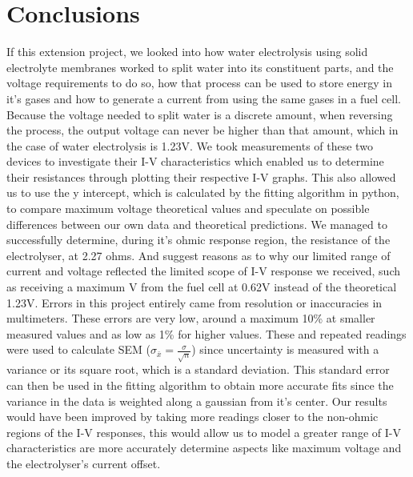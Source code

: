 \documentclass{article}
\begin{document}
    \section{Conclusions}
    If this extension project, we looked into how water electrolysis using solid electrolyte membranes worked to split water into its constituent parts, 
    and the voltage requirements to do so, how that process can be used to store energy in it's gases and how to generate a current from using the same gases in a fuel cell. 
    Because the voltage needed to split water is a discrete amount, when reversing the process, the output voltage can never be higher than that amount, which in the case of 
    water electrolysis is 1.23V.
    \newline We took measurements of these two devices to investigate their I-V characteristics which enabled us to determine their resistances through plotting their respective I-V 
    graphs. This also allowed us to use the y intercept, which is calculated by the fitting algorithm in python, to compare maximum voltage theoretical values and speculate on 
    possible differences between our own data and theoretical predictions.
    \newline We managed to successfully determine, during it's ohmic response region, the resistance of the electrolyser, at 2.27 ohms. And suggest reasons as to why our limited range of 
    current and voltage reflected the limited scope of I-V response we received, such as receiving a maximum V from the fuel cell at 0.62V instead of the theoretical 1.23V.
    \newline \newline Errors in this project entirely came from resolution or inaccuracies in multimeters. These errors are very low, around a maximum 10\% at smaller measured values and as low as 1\% for higher values. 
    These and repeated readings were used to calculate SEM (\(\sigma_{\bar{x}} = \frac{\sigma}{\sqrt{n}}\)) since uncertainty is measured with a variance or its square root, which is a standard deviation. This standard error can then be used in the fitting algorithm 
    to obtain more accurate fits since the variance in the data is weighted along a gaussian from it's center.
    \newline Our results would have been improved by taking more readings closer to the non-ohmic regions of the I-V responses, this would allow us to model a greater range of I-V characteristics are more accurately 
    determine aspects like maximum voltage and the electrolyser's current offset.
\end{document}
